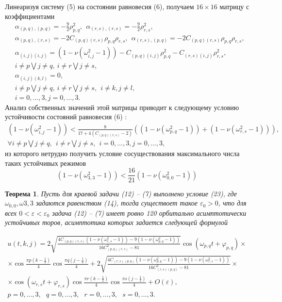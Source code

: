 \documentclass[12pt]{article}  %
\begin{document}
Линеаризуя систему (5) на состоянии равновесия (6), получаем $16\times16$ матрицу с коэффициентами
\begin{equation}
\begin{split}
&\alpha_{(p,q),(p,q)}=-\frac92\rho^2_{p,q}, \ \ \alpha_{(r,s),(r,s)}=-\frac92\rho^2_{r,s},\\
&\alpha_{(p,q),(r,s)}=-2C_{(p,q)(r,s)}\rho_{p,q}\rho_{r,s}, \ \ \alpha_{(r,s),(p,q)}=-2C_{(p,q)(r,s)}\rho_{p,q}\rho_{r,s},\\
&\alpha_{(i,j)(i,j)} = (1 - \nu(\omega^2_{i,j}-1)) - C_{(p,q)(i,j)}\rho^2_{p,q} - C_{(r,s)(i,j)}\rho^2_{r,s},\\
&i\not=p \bigvee j\not=q, \ i\not=r \bigvee j\not=s,\\
&\alpha_{(i,j)(k,l)}=0,\\
&i\not=p \bigvee j\not=q, \ i\not=r \bigvee j\not=s, \ \ i\not=k, j\not=l,\\
&i=0,\dots,3,j=0,\dots,3.
\end{split}
\end{equation}
Анализ собственных значений этой матрицы приводит к следующему условию устойчивости состояний равновесия (6) :
\begin{multline}
(1 - \nu(\omega^2_{i,j}-1)) < \frac8{17+4(C_{(p,q)(r,s)}-2)}((1 - \nu(\omega^2_{p,q}-1))+(1 - \nu(\omega^2_{r,s}-1))),\\
\forall i\not=p\bigvee j\not=q, \ \ i\not=r\bigvee j\not=s, \ \ i=0,\dots,3,j=0,\dots,3,
\end{multline}
из которого нетрудно получить условие сосуществования максимального числа таких устойчивых режимов
\begin{equation}
(1 - \nu(\omega^2_{3,3}-1)) < \frac{16}{21}(1 - \nu(\omega^2_{0,0}-1))
\end{equation}
\newtheorem{Th}{Теорема}
\begin{Th}
	Пусть для краевой задачи (12) \--- (7) выполнено условие (23), где $\omega_{0,0},\omega{3,3}$ задаются равенством (14), тогда существоет такое $\varepsilon_0>0$, что для всех $0<\varepsilon<\varepsilon_0$ задача (12) \--- (7) имеет ровно 120 орбитально асимптотически устойчивых торов, асимптотика которых задается следующей формулой
\end{Th}
      
\begin{multline}
u(t,k,j) = 2\sqrt{\frac{4C_{(p,q)(r,s)}(1-\nu(\omega^2_{r,s}-1))-9(1-\nu(\omega^2_{p,q}-1))}{16C^2_{(p,q)(r,s)}-81}}\cos(\omega_{p,q}t+\varphi_{p,q})\times\\
\times\cos\frac{\pi p(k-\frac{1}{2})}4\cos\frac{\pi q(j-\frac{1}{2})}4+2\sqrt{\frac{4C_{(r,s)(p,q)}(1-\nu(\omega^2_{p,q}-1))-9(1-\nu(\omega^2_{r,s}-1))}{16C^2_{(r,s)(p,q)}-81}}\times\\
\times\cos(\omega_{r,s}t+\varphi_{r,s})\cos\frac{\pi r(k-\frac{1}{2})}4\cos\frac{\pi s(j-\frac{1}{2})}4 + O(\varepsilon),\\
p=0,\dots,3, \ \ \ q=0,\dots,3, \ \ \ r=0,\dots,3, \ \ \ s=0,\dots,3.
\end{multline}
\end{document}
